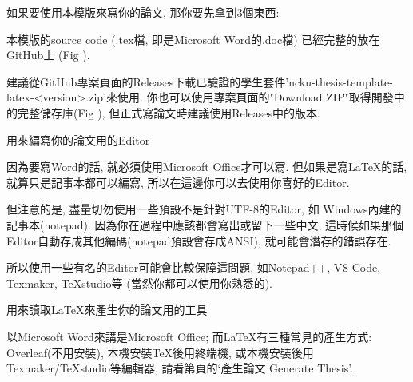 
如果要使用本模版來寫你的論文, 那你要先拿到3個東西:


本模版的source code (.tex檔, 即是Microsoft Word的.doc檔) 已經完整的放在GitHub上 (Fig ).


建議從GitHub專案頁面的Releases下載已驗證的學生套件'ncku-thesis-template-latex-<version>.zip'來使用. 你也可以使用專案頁面的"Download ZIP"取得開發中的完整儲存庫(Fig ), 但正式寫論文時建議使用Releases中的版本.


用來編寫你的論文用的Editor

因為要寫Word的話, 就必須使用Microsoft Office才可以寫. 但如果是寫LaTeX的話, 就算只是記事本都可以編寫, 所以在這邊你可以去使用你喜好的Editor.

但注意的是, 盡量切勿使用一些預設不是針對UTF-8的Editor, 如 Windows內建的記事本(notepad). 因為你在過程中應該都會寫出或留下一些中文, 這時候如果那個Editor自動存成其他編碼(notepad預設會存成ANSI), 就可能會潛存的錯誤存在.

所以使用一些有名的Editor可能會比較保障這問題, 如Notepad++, VS Code, Texmaker, TeXstudio等 (當然你都可以使用你熟悉的).



用來讀取LaTeX來產生你的論文用的工具

以Microsoft Word來講是Microsoft Office; 而LaTeX有三種常見的產生方式: Overleaf(不用安裝), 本機安裝TeX後用終端機, 或本機安裝後用Texmaker/TeXstudio等編輯器, 請看第頁的`產生論文 Generate Thesis'.

